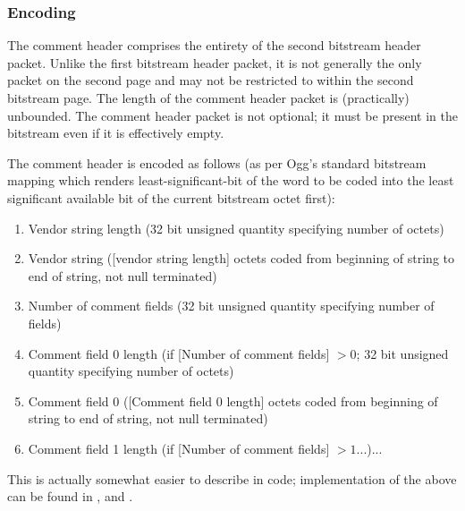 \subsubsection{Encoding}

The comment header comprises the entirety of the second bitstream
header packet.  Unlike the first bitstream header packet, it is not
generally the only packet on the second page and may not be restricted
to within the second bitstream page.  The length of the comment header
packet is (practically) unbounded.  The comment header packet is not
optional; it must be present in the bitstream even if it is
effectively empty.

The comment header is encoded as follows (as per Ogg's standard
bitstream mapping which renders least-significant-bit of the word to be
coded into the least significant available bit of the current
bitstream octet first):

\begin{enumerate}
 \item
  Vendor string length (32 bit unsigned quantity specifying number of octets)

 \item
  Vendor string ([vendor string length] octets coded from beginning of string to end of string, not null terminated)

 \item
  Number of comment fields (32 bit unsigned quantity specifying number of fields)

 \item
  Comment field 0 length (if [Number of comment fields] $>0$; 32 bit unsigned quantity specifying number of octets)

 \item
  Comment field 0 ([Comment field 0 length] octets coded from beginning of string to end of string, not null terminated)

 \item
  Comment field 1 length (if [Number of comment fields] $>1$...)...

\end{enumerate}


This is actually somewhat easier to describe in code; implementation of the above can be found in ,  and .






